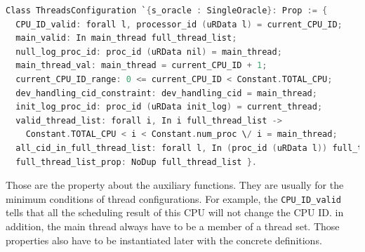 \begin{lstlisting}[language=C]
Class ThreadsConfiguration `{s_oracle : SingleOracle}: Prop := {
  CPU_ID_valid: forall l, processor_id (uRData l) = current_CPU_ID;
  main_valid: In main_thread full_thread_list;
  null_log_proc_id: proc_id (uRData nil) = main_thread;
  main_thread_val: main_thread = current_CPU_ID + 1;
  current_CPU_ID_range: 0 <= current_CPU_ID < Constant.TOTAL_CPU;
  dev_handling_cid_constraint: dev_handling_cid = main_thread;
  init_log_proc_id: proc_id (uRData init_log) = current_thread;
  valid_thread_list: forall i, In i full_thread_list -> 
    Constant.TOTAL_CPU < i < Constant.num_proc \/ i = main_thread;
  all_cid_in_full_thread_list: forall l, In (proc_id (uRData l)) full_thread_list;
  full_thread_list_prop: NoDup full_thread_list }. 
\end{lstlisting}

Those are the property about the auxiliary functions. 
They are usually for the minimum conditions of 
thread configurations. 
For example, 
the \lstinline$CPU_ID_valid$ tells that all the scheduling result of this CPU 
will not change the CPU ID. 
in addition, 
the main thread always have to be a member of a thread set. 
Those properties also have to be instantiated later with the concrete definitions.

